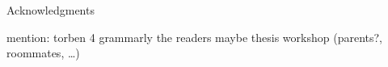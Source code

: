 \thispagestyle{empty}

\vspace*{20mm}

\begin{center}
{ Acknowledgments}
\end{center}

\vspace{10mm}


mention: torben 4 grammarly
the readers
maybe thesis workshop
(parents?, roommates, \ldots)

\cleardoublepage{}
